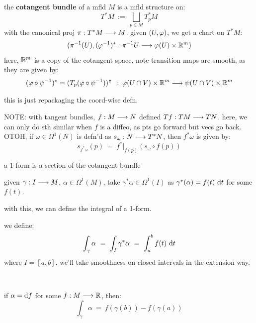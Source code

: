 \begin{defn}
	the \textbf{cotangent bundle} of a mfld $M$ is a mfld structure on:
	\begin{equation*}
		T^{*}M \ := \ \bigsqcup_{p\in M}T_{p}^{*}M
	\end{equation*}
	with the canonical proj $\pi:T^{*}M\longrightarrow M$.
	given $(U,\varphi)$, we get a chart on $T^{*}M$:
	\begin{equation*}
		(\pi^{-1}(U),(\varphi^{-1})^{*}:\pi^{-1}U\longrightarrow\varphi(U)\times\mathbb{R}^{m})
	\end{equation*}
	here, $\mathbb{R}^{m}$ is a copy of the cotangent space.
	note transition maps are smooth, as they are given by:
	\begin{equation*}
		(\varphi\circ\psi^{-1})^{*} = (T_{p}(\varphi\circ\psi^{-1}))^{\intercal} \ : \ \varphi(U\cap V)\times\mathbb{R}^{m}\longrightarrow\psi(U\cap V)\times\mathbb{R}^{m}
	\end{equation*}
\end{defn}
this is just repackaging the coord-wise defn.

NOTE: with tangent bundles, $f:M\longrightarrow N$ defined $Tf:TM\longrightarrow TN$.
here, we can only do sth similar when $f$ is a diffeo, as pts go forward but
vecs go back.
OTOH, if $\omega\in\Omega^{1}(N)$ is defn'd as $s_{\omega}:N\longrightarrow T^{*}N$, then
$f^{*}\omega$ is given by:
\begin{equation*}
	s_{f^{*}\omega}(p) \ = \ f^{*}\big\rvert_{f(p)}(s_{\omega}\circ f(p))
\end{equation*}

\begin{defn}[title=Abstract]
	a 1-form is a section of the cotangent bundle
\end{defn}

given $\gamma:I\longrightarrow M$, $\alpha\in\Omega^{1}(M)$, take $\gamma^{*}\alpha\in\Omega^{1}(I)$ as
$\gamma^{*}(\alpha)=f(t)\textrm{ d} t$ for some $f(t)$.

with this, we can define the integral of a 1-form.

\begin{defn}
	we define:
	\begin{equation*}
		\int_{\gamma}\alpha \ = \ \int_{I}\gamma^{*}\alpha \ = \ \int_{a}^{b}f(t)\di t
	\end{equation*}
	where $I=[a,b]$.
	we'll take smoothness on closed intervals in the extension way.
\end{defn} \

\begin{prop}
	if $\alpha=\textrm{d} f$ for some $f:M\longrightarrow\mathbb{R}$, then:
	\begin{equation*}
		\int_{\gamma}\alpha \ = \ f(\gamma(b))-f(\gamma(a))
	\end{equation*}
\end{prop} \

